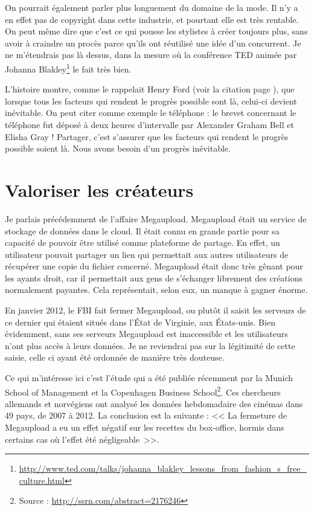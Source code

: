 On pourrait également parler plus longuement du domaine de la mode.
Il n'y a en effet pas de copyright dans cette industrie, et pourtant elle est très rentable.
On peut même dire que c'est ce qui pousse les stylistes à créer toujours plus, sans avoir à craindre un procès parce qu'ils ont réutilisé une idée d'un concurrent.
Je ne m'étendrais pas là dessus, dans la mesure où la conférence TED animée par Johanna Blakley\footnote{\url{http://www.ted.com/talks/johanna_blakley_lessons_from_fashion_s_free_culture.html}} le fait très bien.

L'histoire montre, comme le rappelait Henry Ford (voir la citation page \pageref{ford}), que lorsque tous les facteurs qui rendent le progrès possible sont là, celui-ci devient inévitable.
On peut citer comme exemple le téléphone : le brevet concernant le téléphone fut déposé à deux heures d'intervalle par Alexander Graham Bell et Elisha Gray !
Partager, c'est s'assurer que les facteurs qui rendent le progrès possible soient là.
Nous avons besoin d'un progrès inévitable.

\section{Valoriser les créateurs}

Je parlais précédemment de l'affaire Megaupload.
Megaupload était un service de stockage de données dans le cloud.
Il était connu en grande partie pour sa capacité de pouvoir être utilisé comme plateforme de partage.
En effet, un utilisateur pouvait partager un lien qui permettait aux autres utilisateurs de récupérer une copie du fichier concerné.
Megaupload était donc très gênant pour les ayants droit, car il permettait aux gens de s'échanger librement des créations normalement payantes.
Cela représentait, selon eux, un manque à gagner énorme.

En janvier 2012, le FBI fait fermer Megaupload, ou plutôt il saisit les serveurs de ce dernier qui étaient situés dans l'État de Virginie, aux États-unis.
Bien évidemment, sans ses serveurs Megaupload est inaccessible et les utilisateurs n'ont plus accès à leurs données.
Je ne reviendrai pas sur la légitimité de cette saisie, celle ci ayant été ordonnée de manière très douteuse.

Ce qui m'intéresse ici c'est l'étude qui a été publiée récemment par la Munich School of Management et la Copenhagen Business School\footnote{Source : \url{http://ssrn.com/abstract=2176246}}.
Ces chercheurs allemands et norvégiens ont analysé les données hebdomadaire des cinémas dans 49 pays, de 2007 à 2012.
La conclusion est la suivante : << La fermeture de Megaupload a eu un effet négatif sur les recettes du box-office, hormis dans certains cas où l'effet été négligeable~>>.

